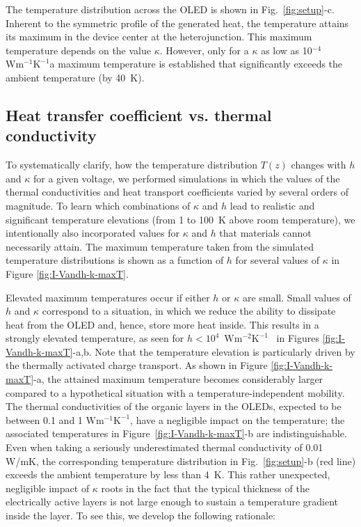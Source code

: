 \documentclass[%
9pt,
 aip,
rsi,%
 amsmath,amssymb,
preprint,%
]{revtex4-1}
\newcommand{\thermalconductivity}{$\mathrm{W m^{-1} K^{-1}}$}
\newcommand{\hcoefficient}{$\mathrm{W m^{-2} K^{-1}}$}
\begin{document}
The temperature distribution across the OLED is shown in Fig.~\ref{fig:setup}-c. Inherent to the symmetric profile of the generated heat, the temperature attains its maximum in the device center at the heterojunction. This maximum temperature depends on the value $\kappa$. However, only for a $\kappa$ as low as 10$^{-4}$~\thermalconductivity a maximum temperature is established that significantly exceeds the ambient temperature (by 40~K).   

\subsection{Heat transfer coefficient vs. thermal conductivity}
To systematically clarify, how the temperature distribution $T(z)$ changes with $h$ and $\kappa$ for a given voltage, we performed simulations in which the values of the thermal conductivities and heat transport coefficients varied by several orders of magnitude. 
To learn which combinations of $\kappa$ and $h$ lead to realistic and significant temperature elevations (from 1 to 100~K above room temperature), we intentionally also incorporated values for $\kappa$ and $h$ that materials cannot necessarily attain.
The maximum temperature taken from the simulated temperature distributions is shown as a function of $h$ for several values of $\kappa$ in Figure \ref{fig:I-Vandh-k-maxT}.

Elevated maximum temperatures occur if either $h$ or $\kappa$ are small. Small values of $h$ and $\kappa$ correspond to a situation, in which we reduce the ability to dissipate heat from the OLED and, hence, store more heat inside.
This results in a strongly elevated temperature, as seen for $h<10^4$~\hcoefficient~ in Figures \ref{fig:I-Vandh-k-maxT}-a,b. Note that the temperature elevation is particularly driven by the thermally activated charge transport. As shown in Figure \ref{fig:I-Vandh-k-maxT}-a, the attained maximum temperature becomes considerably larger compared to a hypothetical situation with a temperature-independent mobility.
The thermal conductivities of the organic layers in the OLEDs, expected to be between 0.1 and 1 \thermalconductivity, have a negligible impact on the temperature; the associated temperatures in Figure~\ref{fig:I-Vandh-k-maxT}-b are indistinguishable.
Even when taking a seriously underestimated thermal conductivity of 0.01 W/mK, the corresponding temperature distribution in Fig.~\ref{fig:setup}-b (red line) exceeds the ambient temperature by less than 4~K. 
This rather unexpected, negligible impact of $\kappa$ roots in the fact that the typical thickness of the electrically active layers is not large enough to sustain a temperature gradient inside the layer. To see this, we develop the following rationale: 
\end{document}
